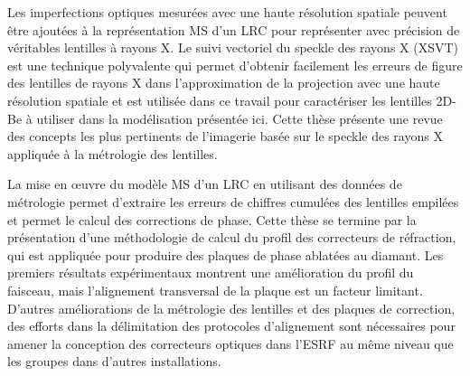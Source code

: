 Les imperfections optiques mesurées avec une haute résolution spatiale peuvent être ajoutées à la représentation MS d'un LRC pour représenter avec précision de véritables lentilles à rayons X. Le suivi vectoriel du speckle des rayons X (XSVT) est une technique polyvalente qui permet d'obtenir facilement les erreurs de figure des lentilles de rayons X dans l'approximation de la projection avec une haute résolution spatiale et est utilisée dans ce travail pour caractériser les lentilles 2D-Be à utiliser dans la modélisation présentée ici. Cette thèse présente une revue des concepts les plus pertinents de l'imagerie basée sur le speckle des rayons X appliquée à la métrologie des lentilles.

La mise en œuvre du modèle MS d'un LRC en utilisant des données de métrologie permet d'extraire les erreurs de chiffres cumulées des lentilles empilées et permet le calcul des corrections de phase. Cette thèse se termine par la présentation d'une méthodologie de calcul du profil des correcteurs de réfraction, qui est appliquée pour produire des plaques de phase ablatées au diamant. Les premiers résultats expérimentaux montrent une amélioration du profil du faisceau, mais l'alignement transversal de la plaque est un facteur limitant. D'autres améliorations de la métrologie des lentilles et des plaques de correction, des efforts dans la délimitation des protocoles d'alignement sont nécessaires pour amener la conception des correcteurs optiques dans l'ESRF au même niveau que les groupes dans d'autres installations.